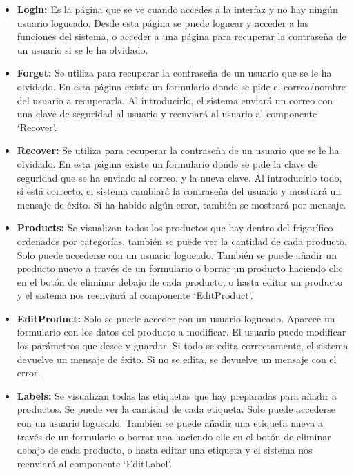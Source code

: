 \begin{itemize}
    \item \textbf{Login:} Es la página que se ve cuando accedes a la interfaz y no hay ningún usuario logueado. Desde esta página se puede loguear y acceder a las funciones del sistema, o acceder a una página para recuperar la contraseña de un usuario si se le ha olvidado.
    
    \item \textbf{Forget:} Se utiliza para recuperar la contraseña de un usuario que se le ha olvidado. En esta página existe un formulario donde se pide el correo/nombre del usuario a recuperarla. Al introducirlo, el sistema enviará un correo con una clave de seguridad al usuario y reenviará al usuario al componente ‘Recover’.
    
    \item \textbf{Recover:} Se utiliza para recuperar la contraseña de un usuario que se le ha olvidado. En esta página existe un formulario donde se pide la clave de seguridad que se ha enviado al correo, y la nueva clave. Al introducirlo todo, si está correcto, el sistema cambiará la contraseña del usuario y mostrará un mensaje de éxito. Si ha habido algún error, también se mostrará por mensaje.
    
    \item \textbf{Products:} Se visualizan todos los productos que hay dentro del frigorífico ordenados por categorías, también se puede ver la cantidad de cada producto. Solo puede accederse con un usuario logueado. También se puede añadir un producto nuevo a través de un formulario o borrar un producto haciendo clic en el botón de eliminar debajo de cada producto, o hasta editar un producto y el sistema nos reenviará al componente ‘EditProduct’.
    
    \item \textbf{EditProduct:} Solo se puede acceder con un usuario logueado. Aparece un formulario con los datos del producto a modificar. El usuario puede modificar los parámetros que desee y guardar. Si todo se edita correctamente, el sistema devuelve un mensaje de éxito. Si no se edita, se devuelve un mensaje con el error.
    
    \item \textbf{Labels:} Se visualizan todas las etiquetas que hay preparadas para añadir a productos. Se puede ver la cantidad de cada etiqueta. Solo puede accederse con un usuario logueado. También se puede añadir una etiqueta nueva a través de un formulario o borrar una haciendo clic en el botón de eliminar debajo de cada producto, o hasta editar una etiqueta y el sistema nos reenviará al componente ‘EditLabel’.
    

\end{itemize}
